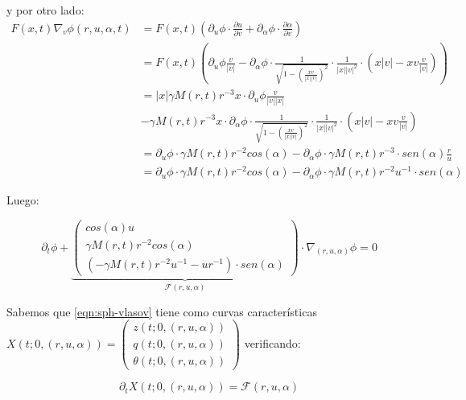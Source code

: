 \documentclass[a4paper,10pt]{scrartcl}
\theoremstyle{definition}
\numberwithin{equation}{section}
\begin{document}
y  por otro lado:
\begin{align*}
F(x,t) \nabla_v \phi(r, u, \alpha, t) &= F(x,t) \left(\partial_u \phi \cdot \frac{\partial u}{\partial v} + \partial_\alpha \phi \cdot \frac{\partial \alpha}{\partial v} \right) \\
&= F(x,t) \left(\partial_u \phi \frac{v}{|v|} - \partial_\alpha \phi \cdot \frac{1}{\sqrt{1 - \left(\frac{xv}{|x||v|}\right)^2}} \cdot \frac{1}{|x||v|^2} \cdot\left(x|v| - xv \frac{v}{|v|}\right)\right) \\
&= |x| \gamma M(r,t) r^{-3} x \cdot \partial_u \phi \frac{v}{|v||x|}\\
&- \gamma M(r,t) r^{-3} x \cdot \partial_\alpha \phi \cdot \frac{1}{\sqrt{1 - \left(\frac{xv}{|x||v|}\right)^2}} \cdot \frac{1}{|x||v|^2} \cdot\left(x|v| - xv \frac{v}{|v|}\right)\\
&= \partial_u \phi \cdot \gamma M(r,t) r^{-2} cos(\alpha) - \partial_\alpha \phi \cdot \gamma M(r,t) r^{-3} \cdot sen(\alpha) \frac{r}{u} \\
&= \partial_u \phi \cdot \gamma M(r,t) r^{-2} cos(\alpha) - \partial_\alpha \phi \cdot \gamma M(r,t) r^{-2} u^{-1} \cdot sen(\alpha)
\end{align*}

Luego:

\begin{equation}
\label{eqn:sph-vlasov}
\partial_t \phi + \underbrace{
    \left(\begin{array}{c}
        cos(\alpha)u\\
        \gamma M(r,t) r^{-2} cos(\alpha)\\
        (-\gamma M(r,t) r^{-2} u^{-1} - ur^{-1})\cdot sen(\alpha)
    \end{array}\right)}_{\mathcal{F}(r,u,\alpha)}
    \cdot \nabla_{(r,u,\alpha)} \phi = 0
\end{equation}

Sabemos que \eqref{eqn:sph-vlasov} tiene como curvas características $X(t; 0, (r,u,\alpha)) = 
\left(\begin{array}{c} 
       z(t; 0, (r, u, \alpha))\\ q(t; 0, (r, u, \alpha))\\ \theta(t; 0, (r, u, \alpha))
      \end{array}\right)$
verificando:

\begin{equation}
\label{eqn:sph-cc}
\partial_t X(t; 0,(r,u,\alpha)) = \mathcal{F}(r,u,\alpha)
\end{equation}
\end{document}
